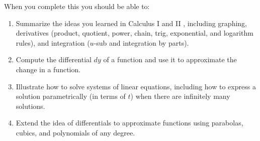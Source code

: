 

When you complete this \chpname you should be able to:
\begin{enumerate}
\item Summarize the ideas you learned in Calculus I and II , including graphing, derivatives (product, quotient, power, chain, trig, exponential, and logarithm rules), and integration ($u$-sub and integration by parts).
\item Compute the differential $dy$ of a function and use it to approximate the change in a function. 
\item Illustrate how to solve systems of linear equations, including how to express a solution parametrically (in terms of $t$) when there are infinitely many solutions.
\item Extend the idea of differentials to approximate functions using parabolas, cubics, and polynomials of any degree.
\end{enumerate}

%

\newpage


